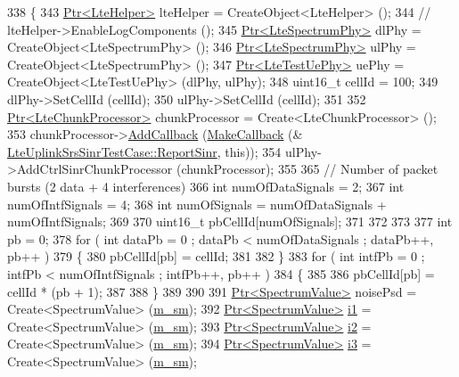 \begin{DoxyCode}
338 \{
343   \hyperlink{classns3_1_1Ptr}{Ptr<LteHelper>} lteHelper = CreateObject<LteHelper> ();
344   \textcolor{comment}{// lteHelper->EnableLogComponents ();}
345   \hyperlink{classns3_1_1Ptr}{Ptr<LteSpectrumPhy>} dlPhy = CreateObject<LteSpectrumPhy> ();
346   \hyperlink{classns3_1_1Ptr}{Ptr<LteSpectrumPhy>} ulPhy = CreateObject<LteSpectrumPhy> ();
347   \hyperlink{classns3_1_1Ptr}{Ptr<LteTestUePhy>} uePhy = CreateObject<LteTestUePhy> (dlPhy, ulPhy);
348   uint16\_t cellId = 100;
349   dlPhy->SetCellId (cellId);
350   ulPhy->SetCellId (cellId);
351   
352   \hyperlink{classns3_1_1Ptr}{Ptr<LteChunkProcessor>} chunkProcessor = Create<LteChunkProcessor> ();
353   chunkProcessor->\hyperlink{classns3_1_1LteChunkProcessor_a122d4a00d72e68a0a8b2cbdd165cdfd8}{AddCallback} (\hyperlink{group__makecallbackmemptr_ga9376283685aa99d204048d6a4b7610a4}{MakeCallback} (&
      \hyperlink{classLteUplinkSrsSinrTestCase_a18b2dde96beaf833a2af98219b8a57e8}{LteUplinkSrsSinrTestCase::ReportSinr}, \textcolor{keyword}{this}));
354   ulPhy->AddCtrlSinrChunkProcessor (chunkProcessor);
355 
365   \textcolor{comment}{// Number of packet bursts (2 data + 4 interferences)}
366   \textcolor{keywordtype}{int} numOfDataSignals = 2;
367   \textcolor{keywordtype}{int} numOfIntfSignals = 4;
368   \textcolor{keywordtype}{int} numOfSignals = numOfDataSignals + numOfIntfSignals;
369 
370   uint16\_t pbCellId[numOfSignals];
371   
372   
373   
377   \textcolor{keywordtype}{int} pb = 0;
378   \textcolor{keywordflow}{for} ( \textcolor{keywordtype}{int} dataPb = 0 ; dataPb < numOfDataSignals ; dataPb++, pb++ )
379     \{
380       pbCellId[pb] = cellId;
381 
382     \}
383   \textcolor{keywordflow}{for} ( \textcolor{keywordtype}{int} intfPb = 0 ; intfPb < numOfIntfSignals ; intfPb++, pb++ )
384     \{
385 
386       pbCellId[pb] = cellId * (pb + 1);
387 
388     \}
389   
390   
391   \hyperlink{classns3_1_1Ptr}{Ptr<SpectrumValue>} noisePsd = Create<SpectrumValue> (\hyperlink{classLteUplinkSrsSinrTestCase_aa5071a03e01428f289066683345609a3}{m\_sm});
392   \hyperlink{classns3_1_1Ptr}{Ptr<SpectrumValue>} \hyperlink{generate__test__data__lte__sinr_8m_ac6ef61fb0fec52abd81fd71388742cc0}{i1} = Create<SpectrumValue> (\hyperlink{classLteUplinkSrsSinrTestCase_aa5071a03e01428f289066683345609a3}{m\_sm});
393   \hyperlink{classns3_1_1Ptr}{Ptr<SpectrumValue>} \hyperlink{generate__test__data__lte__sinr_8m_a2fce890a7c411f1fe7c0c55ec9eb4106}{i2} = Create<SpectrumValue> (\hyperlink{classLteUplinkSrsSinrTestCase_aa5071a03e01428f289066683345609a3}{m\_sm});
394   \hyperlink{classns3_1_1Ptr}{Ptr<SpectrumValue>} \hyperlink{generate__test__data__lte__sinr_8m_abc662ad7939244d9dc80a99f233212bf}{i3} = Create<SpectrumValue> (\hyperlink{classLteUplinkSrsSinrTestCase_aa5071a03e01428f289066683345609a3}{m\_sm});

\end{DoxyCode}
